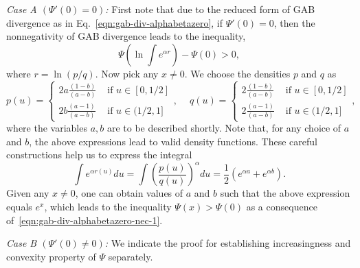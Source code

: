 \documentclass[11pt]{article}
\theoremstyle{plain}
\theoremstyle{remark}
\begin{document}
\noindent \emph{Case A $(\Psi'(0) = 0)$:} First note that due to the reduced form of GAB divergence as in Eq.~\eqref{eqn:gab-div-alphabetazero}, if $\Psi'(0) = 0$, then the nonnegativity of GAB divergence leads to the inequality,
\begin{equation}
    \Psi(\ln \textstyle\int e^{\alpha r}) - \Psi(0) > 0,
    \label{eqn:gab-div-alphabetazero-nec-1}
\end{equation}
\noindent where $r = \ln(p/q)$. Now pick any $x \neq 0$. We choose the densities $p$ and $q$ as
\begin{equation*}
    p(u) = \begin{cases}
        2a\frac{(1-b)}{(a-b)} & \text{ if } u \in [0, 1/2] \\
        2b\frac{(a-1)}{(a-b)} & \text{ if } u \in (1/2, 1]
    \end{cases},
    \ \quad
    q(u) = \begin{cases}
        2\frac{(1-b)}{(a-b)} & \text{ if } u \in [0, 1/2] \\
        2\frac{(a-1)}{(a-b)} & \text{ if } u \in (1/2, 1]
    \end{cases},
\end{equation*}
\noindent where the variables $a, b$ are to be described shortly. Note that, for any choice of $a$ and $b$, the above expressions lead to valid density functions. These careful constructions help us to express the integral
\begin{equation*}
    \int e^{\alpha r(u)}du = \int \left( \frac{p(u)}{q(u)}\right)^\alpha du = \frac{1}{2}\left( e^{\alpha a} + e^{\alpha b} \right).
\end{equation*}
\noindent Given any $x \neq 0$, one can obtain values of $a$ and $b$ such that the above expression equals $e^x$, which leads to the inequality $\Psi(x) > \Psi(0)$ as a consequence of~\eqref{eqn:gab-div-alphabetazero-nec-1}.

\noindent \emph{Case B $(\Psi'(0) \neq 0)$:} We indicate the proof for establishing increasingness and convexity property of $\Psi$ separately.
\end{document}

